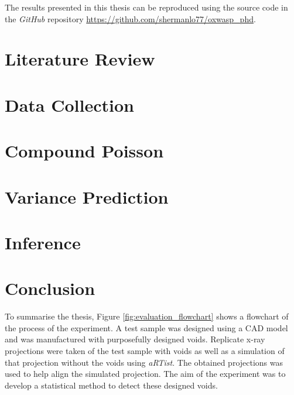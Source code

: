 \documentclass[12pt, a4paper, oneside]{memoir}
\begin{document}
The results presented in this thesis can be reproduced using the source code in the \emph{GitHub} repository \url{https://github.com/shermanlo77/oxwasp_phd}.

\chapter{Literature Review}
\label{chapter1}


\chapter{Data Collection}
\label{chapter2}


\chapter{Compound Poisson}
\label{chapter3}


\chapter{Variance Prediction}
\label{chapter4}


\chapter{Inference}
\label{chapter5}


\chapter{Conclusion}
\label{chapter6}
To summarise the thesis, Figure \ref{fig:evaluation_flowchart} shows a flowchart of the process of the experiment. A test sample was designed using a CAD model and was manufactured with purposefully designed voids. Replicate x-ray projections were taken of the test sample with voids as well as a simulation of that projection without the voids using \emph{aRTist}. The obtained projections was used to help align the simulated projection. The aim of the experiment was to develop a statistical method to detect these designed voids.
\end{document}
